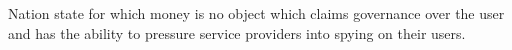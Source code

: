 Nation state for which money is no object which claims governance over the user
and has the ability to pressure service providers into spying on their users.
